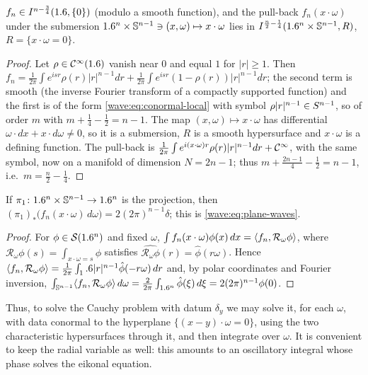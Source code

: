 \begin{lemma}\label{wave:lem:fn}
$f_n\in I^{n-\frac34}(1.6,\{0\})$ (modulo a smooth function), and the pull-back
$f_n(x\cdot\omega)$ under the submersion $1.6^n\times\mathbb{S}^{n-1}\ni(x,\omega)\mapsto x\cdot\omega$
lies in $I^{\frac n2-\frac14}(1.6^n\times\mathbb{S}^{n-1},R)$, $R=\{x\cdot\omega=0\}$.
\end{lemma}
\begin{proof}
Let $\rho\in\mathcal{C}^\infty(1.6)$ vanish near $0$ and equal $1$ for $|r|\ge1$. Then
$f_n=\frac1{2\pi}\int e^{isr}\rho(r)|r|^{n-1}dr+\frac1{2\pi}\int e^{isr}(1-\rho(r))|r|^{n-1}dr$;
the second term is smooth (the inverse Fourier transform of a compactly supported
function) and the first is of the form \eqref{wave:eq:conormal-local} with symbol
$\rho|r|^{n-1}\in S^{n-1}$, so of order $m$ with $m+\frac14-\frac12=n-1$. The map
$(x,\omega)\mapsto x\cdot\omega$ has differential $\omega\cdot dx+x\cdot d\omega\ne0$, so it
is a submersion, $R$ is a smooth hypersurface and $x\cdot\omega$ is a defining function.
The pull-back is $\frac1{2\pi}\int e^{i(x\cdot\omega)r}\rho(r)|r|^{n-1}dr+\mathcal{C}^\infty$, with the same
symbol, now on a manifold of dimension $N=2n-1$; thus
$m+\frac{2n-1}4-\frac12=n-1$, i.e.\ $m=\frac n2-\frac14$.
\end{proof}

\begin{proposition}\label{wave:prop:radon}
If $\pi_1\colon1.6^n\times\mathbb{S}^{n-1}\to1.6^n$ is the projection, then
$(\pi_1)_*\big(f_n(x\cdot\omega)\,d\omega\big)=2(2\pi)^{n-1}\delta$; this is \eqref{wave:eq:plane-waves}.
\end{proposition}
\begin{proof}
For $\phi\in\mathcal{S}(1.6^n)$ and fixed $\omega$, $\int f_n(x\cdot\omega)\phi(x)\,dx=\langle f_n, \mathcal R_\omega\phi\rangle$,
where $\mathcal R_\omega\phi(s)=\int_{x\cdot\omega=s}\phi$ satisfies
$\widehat{\mathcal R_\omega\phi}(r)=\hat\phi(r\omega)$. Hence
$\langle f_n, \mathcal R_\omega\phi\rangle=\frac1{2\pi}\int_1.6|r|^{n-1}\hat\phi(-r\omega)\,dr$ and, by
polar coordinates and Fourier inversion,
$\int_{\mathbb{S}^{n-1}}\langle f_n, \mathcal R_\omega\phi\rangle\,d\omega=\frac2{2\pi}\int_{1.6^n}\hat\phi(\xi)\,d\xi=2(2\pi)^{n-1}\phi(0)$.
\end{proof}

Thus, to solve the Cauchy problem with datum $\delta_y$ we may solve it, for each
$\omega$, with data conormal to the hyperplane $\{(x-y)\cdot\omega=0\}$, using the two
characteristic hypersurfaces through it, and then integrate over $\omega$. It is
convenient to keep the radial variable as well: this amounts to an oscillatory
integral whose phase solves the eikonal equation.

